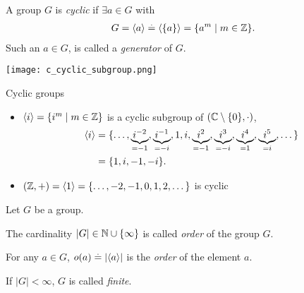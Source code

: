 \begin{defn}
A group $G$ is \emph{cyclic} if $\exists a \in G$ with \begin{align}
    G = \langle a \rangle \overset{.}{=} \langle \{a\} \rangle = \{a^m \mid m \in \mathbb{Z}\}.
\end{align} Such an $a \in G$, is called a \emph{generator} of $G$.
\end{defn}

\begin{marginfigure}
    \texttt{[image: c\_cyclic\_subgroup.png]}
    \caption{An illustration of the cyclic subgroup $\gen{i}$ in the complex plane.}
\end{marginfigure}

\begin{ex}{Cyclic groups}{}
\begin{itemize}
    \item $\langle i \rangle = \{i^m \mid m \in \mathbb{Z}\}$ is a cyclic subgroup of $(\mathbb{C} \setminus \{0\},\cdot)$, \begin{align*}
        \langle i \rangle &= \{\dots, \underbrace{i^{-2}}_{=-1}, \underbrace{i^{-1}}_{=-i}, 1, i, \underbrace{i^2}_{=-1}, \underbrace{i^3}_{=-i}, \underbrace{i^4}_{=1}, \underbrace{i^5}_{=i}, \dots\} \\
                &= \{1, i, -1, -i\}.
    \end{align*}
    \item $(\mathbb{Z},+) = \langle 1 \rangle = \{\dots, -2, -1, 0, 1, 2, \dots\}$ is cyclic
\end{itemize}
\end{ex}

\begin{defn}[Order]
Let $G$ be a group.
\begin{defnlist}
    \item The cardinality $|G| \in \mathbb{N} \cup \{\infty\}$ is called \emph{order} of the group $G$.
    \item For any $a \in G$, $o(a) \overset{.}{=} |\langle a \rangle|$ is the \emph{order} of the element $a$.
\end{defnlist} If $|G| < \infty$, $G$ is called \emph{finite}.
\end{defn}

